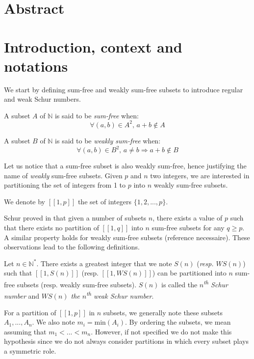 \section{Abstract}



\section{Introduction, context and notations}

We start by defining sum-free and weakly sum-free subsets to introduce regular and weak Schur numbers.

\begin{definition}
A subset \(A\) of \(\mathbb{N}\) is said to be \textit{sum-free} when:
\[ \forall (a,b) \in A^2 \text{, } a+b \notin A\]
\end{definition}

\begin{definition}
A subset \(B\) of \(\mathbb{N}\) is said to be \textit{weakly sum-free} when:
\[ \forall (a,b) \in B^2 \text{, } a \neq b \Longrightarrow a+b \notin B\]
\end{definition}

Let us notice that a sum-free subset is also weakly sum-free, hence justifying the name of \textit{weakly} sum-free
subsets. Given \(p\) and \(n\) two integers, we are interested in partitioning the set of integers from 1 to \(p\) into
\(n\) weakly sum-free subsets.

\begin{notation}
We denote by \([\![1,p]\!]\) the set of integers \(\{1, 2, ..., p\}\).
\end{notation}

Schur proved in \cite{Schur1917} that given a number of subsets \(n\), there exists a value of \(p\)
such that there exists no partition of \([\![1,q]\!]\) into \(n\) sum-free subsets for any \(q \geqslant p\). A similar
property holds for weakly sum-free subsets (reference necessaire). These observations lead to the following definitions.
\begin{definition}
Let \(n \in \mathbb{N}^*\). There exists a greatest integer that we note \(S(n)\) (\textit{resp. \(WS(n)\)}) such that
\([\![1,S(n)]\!]\) (resp. \([\![1,WS(n)]\!]\)) can be partitioned into \(n\) sum-free subsets (resp. weakly sum-free
subsets). \(S(n)\) is called the \textit{\(n\)\textsuperscript{th} Schur number} and \textit{\(WS(n)\) the
\(n\)\textsuperscript{th} weak
Schur number}.
\end{definition}

\begin{notation}
For a partition of \([\![1, p]\!]\) in \(n\) subsets, we generally note these subsets \(A_1, ..., A_n\). We also note
\(m_i = \text{min}(A_i)\).
By ordering the subsets, we mean assuming that \(m_1 < ... < m_n\). However, if not specified we do not make this
hypothesis since we
do not always consider partitions in which every subset plays a symmetric role.
\end{notation}